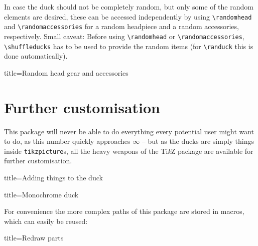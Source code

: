 \documentclass[parskip=half]{scrartcl}
\newcommand{\TikZ}{Ti\emph{k}Z\xspace}
\begin{document}
In case the duck should not be completely random, but only some of the random elements are desired, these can be accessed independently by using \lstinline|\randomhead| and \lstinline|\randomaccessories| for a random headpiece and a random accessories, respectively. Small caveat: Before using \lstinline|\randomhead| or \lstinline|\randomaccessories|, \lstinline|\shuffleducks| has to be used to provide the random items (for \lstinline|\randuck| this is done automatically).     

\begin{tcblisting}{title={Random head gear and accessories}}
\begin{tikzpicture}
	\shuffleducks
	\duck[\randomhead, \randomaccessories]
\end{tikzpicture}
\end{tcblisting}

\clearpage
\section{Further customisation}

This package will never be able to do everything every potential user might want to do, as this number quickly approaches $\infty$ -- but as the ducks are simply things inside \lstinline|tikzpicture|s, all the heavy weapons of the \TikZ package are available for further customisation.

\begin{tcblisting}{title={Adding things to the duck}}
\end{tcblisting}

\begin{tcblisting}{title={Monochrome duck}}
\end{tcblisting}

For convenience the more complex paths of this package are stored in macros, which can easily be reused:

\begin{tcblisting}{title={Redraw parts}}
\begin{tikzpicture}
	\duck
	\path[preaction={fill, red!50!black},pattern=fivepointed stars, pattern color=yellow]  
			\duckpathlonghair;
\end{tikzpicture}
\end{tcblisting}
\end{document}
